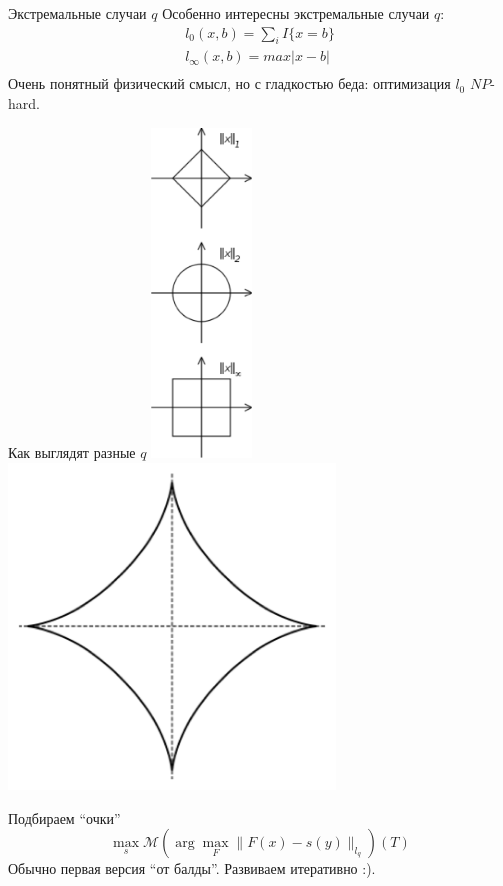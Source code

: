 \documentclass[14pt, fleqn, xcolor={dvipsnames, table}]{beamer}
\begin{document}
\begin{frame}{Экстремальные случаи $q$}
Особенно интересны экстремальные случаи $q$:
$$\begin{array}{l}
l_0(x,b) = \sum_i I\{x = b\} \\
l_{\infty}(x,b) = max |x - b| \\
\end{array}$$
Очень понятный физический смысл, но с гладкостью беда: оптимизация $l_0$ $NP$-hard.
\end{frame}

\begin{frame}{Как выглядят разные $q$}
\centering
\includegraphics[width=0.2\textwidth]{lq1.png}\includegraphics[width=0.65\textwidth]{lq2.png}
\end{frame}

\begin{frame}{Подбираем ``очки''} %
$$
\max_{s} \mathcal{M} \left(\arg\max_{F} \|F(x) - s(y)\|_{l_q}\right)(T)
$$
Обычно первая версия ``от балды''. Развиваем итеративно :).
\end{frame}
\end{document}
